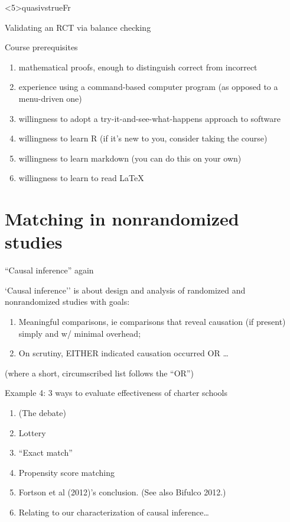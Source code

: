\againframe<5\mynoteonly>{quasivstrueFr}

\begin{frame}{Validating an RCT via balance checking}
  \begin{center}
  \end{center}
\end{frame}

\begin{frame}{Course prerequisites}
  \begin{enumerate}
  \item mathematical proofs, enough to distinguish correct from incorrect 
\item experience using a command-based computer program (as opposed to a menu-driven one)
\item willingness to adopt a try-it-and-see-what-happens approach to software
\item willingness to learn R  (if it's new to you, consider taking the course)
\item willingness to learn markdown (you can do this on your own)
\item willingness to learn to read LaTeX

  \end{enumerate}
\end{frame}


\section{Matching in nonrandomized studies}

\begin{frame}[label=CIFr]{``Causal inference'' again}

`Causal inference'' is about design and analysis of randomized and
nonrandomized studies with goals:
\begin{enumerate}
\item Meaningful comparisons, ie comparisons that reveal causation (if present) simply and w/ minimal overhead;
\item On scrutiny, EITHER indicated causation occurred OR \ldots
\end{enumerate}


(where a short, circumscribed list follows the ``OR'')

\end{frame}

\begin{frame}{Example 4: 3 ways to evaluate effectiveness of charter schools }

\begin{enumerate}
\item (The debate)
\item Lottery
\item ``Exact match''
\item Propensity score matching
\item Fortson et al (2012)'s conclusion. (See also Bifulco 2012.)
\item Relating to our characterization of causal inference\ldots
\end{enumerate}
\end{frame}

